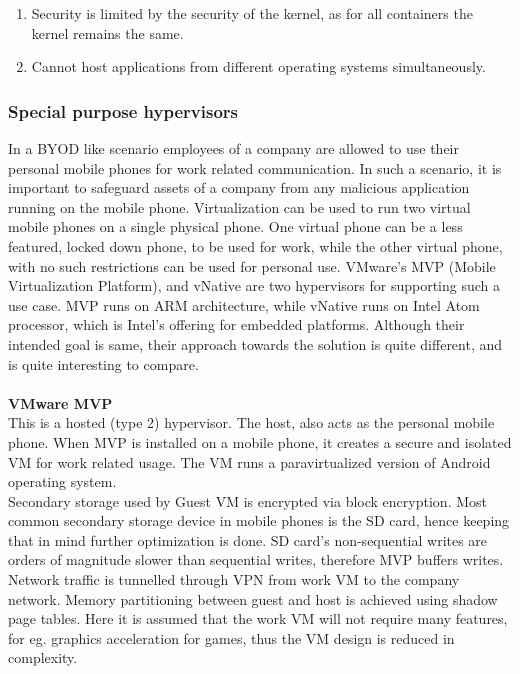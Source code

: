 \documentclass[seminar,twoside]{iitbreport}
\begin{document}
  \begin{enumerate}
   \item Security is limited by the security of the kernel, as for all containers the kernel remains the same.
   \item Cannot host applications from different operating systems simultaneously.
  \end{enumerate}

  \subsubsection{Special purpose hypervisors}
  In a BYOD like scenario employees of a company are allowed to use their personal mobile phones for work related communication. In such a scenario, it is important
  to safeguard assets of a company from any malicious application running on the mobile phone. Virtualization can be used to run two virtual mobile phones
  on a single physical phone. One virtual phone can be a less featured, locked down phone, to be used for work, while the other virtual phone, with no such restrictions
  can be used for personal use. VMware's MVP (Mobile Virtualization Platform)\cite{Barr:2010:VMV:1899928.1899945}, and vNative\cite{7006388} are two hypervisors
  for supporting such a use case. 
  MVP runs on ARM architecture, while vNative runs on Intel Atom processor, which is Intel's offering for embedded platforms.
  Although their intended goal is same, their approach towards the solution is quite different, and is quite interesting to compare.
  \\\\
  \textbf{VMware MVP}
  \\
  This is a hosted (type 2) hypervisor. The host, also acts as the personal mobile phone. When MVP is installed on a mobile phone, it creates a secure and isolated VM for work related usage.
  The VM runs a paravirtualized version of Android operating system.\\
  Secondary storage used by Guest VM is encrypted via block encryption. Most common secondary storage device in mobile phones is the SD card, hence keeping that 
  in mind further optimization is done. SD card's non-sequential writes are orders of magnitude slower than sequential writes, therefore MVP buffers writes.
  Network traffic is tunnelled through VPN from work VM to the company network. Memory partitioning between guest and host is achieved using shadow page tables.
  Here it is assumed that the work VM will not require many features, for eg. graphics acceleration for games, thus the VM design is reduced in complexity.
\end{document}
